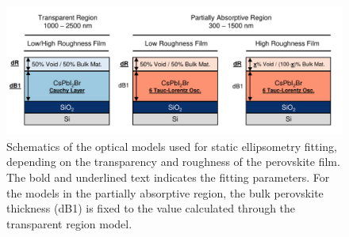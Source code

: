 \begin{figure}
  \centering
  \medskip
  \includegraphics[width=.95\textwidth]{chapters/ellipsometry/image/Model_Approach.pdf}
  \caption{Schematics of the optical models used for static ellipsometry fitting, depending on the transparency and roughness of the perovskite film. The bold and underlined text indicates the fitting parameters. For the models in the partially absorptive region, the bulk perovskite thickness (dB1) is fixed to the value calculated through the transparent region model.}
  \label{fig:ellipsometry:static_models}
\end{figure}


